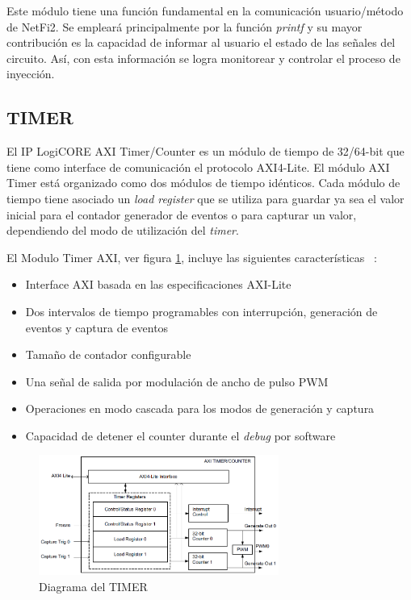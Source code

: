 \documentclass[a4paper,openright,12pt]{report}
\begin{document}
Este módulo tiene una función fundamental en la comunicación usuario/método de NetFi2. Se empleará principalmente por la función \textit{printf} y su mayor contribución es la capacidad de informar al usuario el estado de las señales del circuito. Así, con esta información se logra monitorear y controlar el proceso de inyección.


\subsection{TIMER}
El IP LogiCORE  AXI Timer/Counter es un módulo de tiempo de 32/64-bit que tiene como interface de comunicación el protocolo AXI4-Lite. El módulo AXI Timer  está organizado como dos módulos de tiempo idénticos. Cada módulo de tiempo tiene   asociado un \textit{load register} que se utiliza para guardar ya sea el valor inicial para el contador generador de eventos o para capturar un valor, dependiendo del modo de utilización del \textit{timer}.

El Modulo Timer AXI, ver figura \ref{TIMER}, incluye las siguientes características ~\cite{timer}: 

\begin{itemize}
\item  Interface AXI basada en las especificaciones AXI-Lite
\item  Dos intervalos de tiempo programables con interrupción, generación de eventos y captura de eventos
\item  Tamaño de contador configurable
\item  Una señal de salida por modulación de ancho de pulso PWM
\item Operaciones en modo cascada para los modos de  generación y captura
\item Capacidad de detener el counter durante el \textit{debug} por software
\end{itemize}

\begin{figure}[H]
	\centering
	\includegraphics[width=0.70\textwidth]{img/timer.png}
	\caption{Diagrama del TIMER}
	\label{TIMER}
\end{figure}
\end{document}
